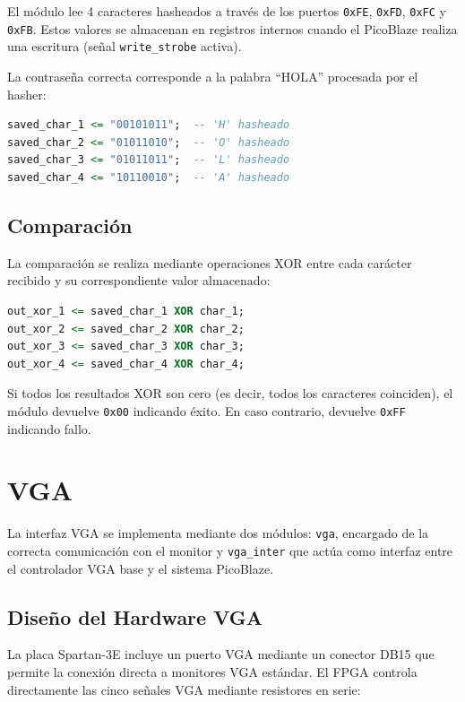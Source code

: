 \documentclass[a4paper, 12pt]{report}
\begin{document}
El módulo lee 4 caracteres hasheados a través de los puertos \texttt{0xFE}, \texttt{0xFD}, \texttt{0xFC} y \texttt{0xFB}. Estos valores se almacenan en registros internos cuando el PicoBlaze realiza una escritura (señal \texttt{write\_strobe} activa).

La contraseña correcta corresponde a la palabra ``HOLA'' procesada por el hasher:

\begin{lstlisting}[language=VHDL, caption={Contraseña hasheada almacenada}]
saved_char_1 <= "00101011";  -- 'H' hasheado
saved_char_2 <= "01011010";  -- 'O' hasheado
saved_char_3 <= "01011011";  -- 'L' hasheado
saved_char_4 <= "10110010";  -- 'A' hasheado
\end{lstlisting}

\subsection{Comparación}
La comparación se realiza mediante operaciones XOR entre cada carácter recibido y su correspondiente valor almacenado:

\begin{lstlisting}[language=VHDL, caption={Operaciones XOR de comparación}]
out_xor_1 <= saved_char_1 XOR char_1;
out_xor_2 <= saved_char_2 XOR char_2;
out_xor_3 <= saved_char_3 XOR char_3;
out_xor_4 <= saved_char_4 XOR char_4;
\end{lstlisting}

Si todos los resultados XOR son cero (es decir, todos los caracteres coinciden), el módulo devuelve \texttt{0x00} indicando éxito. En caso contrario, devuelve \texttt{0xFF} indicando fallo.

\section{VGA}

La interfaz VGA se implementa mediante dos módulos: \texttt{vga}, encargado de la correcta comunicación con el monitor y \texttt{vga\_inter} que actúa como interfaz entre el controlador VGA base y el sistema PicoBlaze.

\subsection{Diseño del Hardware VGA}

La placa Spartan-3E incluye un puerto VGA mediante un conector DB15 que permite la conexión directa a monitores VGA estándar. El FPGA controla directamente las cinco señales VGA mediante resistores en serie:
\end{document}
